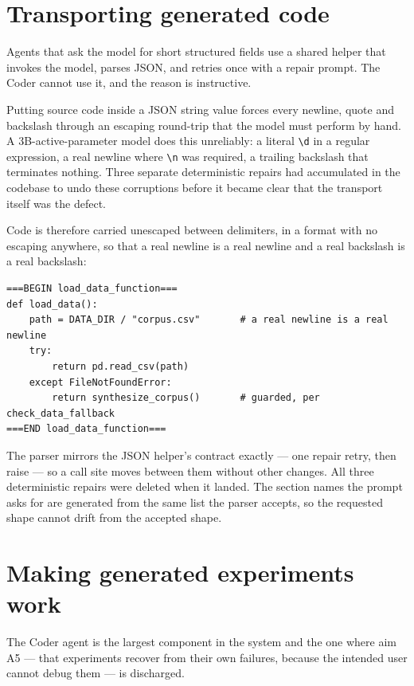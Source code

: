 \section{Transporting generated code}
\label{sec:transport}

Agents that ask the model for short structured fields use a shared helper that invokes the
model, parses JSON, and retries once with a repair prompt. The Coder cannot use it, and the
reason is instructive.

Putting source code inside a JSON string value forces every newline, quote and backslash
through an escaping round-trip that the model must perform by hand. A 3B-active-parameter
model does this unreliably: a literal \texttt{\textbackslash d} in a regular expression, a
real newline where \texttt{\textbackslash n} was required, a trailing backslash that
terminates nothing. Three separate deterministic repairs had accumulated in the codebase to
undo these corruptions before it became clear that the transport itself was the defect.

Code is therefore carried unescaped between delimiters, in a format with no escaping anywhere,
so that a real newline is a real newline and a real backslash is a real backslash:

\begin{lstlisting}[caption={The delimited section format used for all code-bearing responses.},label={lst:sections}]
===BEGIN load_data_function===
def load_data():
    path = DATA_DIR / "corpus.csv"       # a real newline is a real newline
    try:
        return pd.read_csv(path)
    except FileNotFoundError:
        return synthesize_corpus()       # guarded, per check_data_fallback
===END load_data_function===
\end{lstlisting}

The parser mirrors the JSON helper's contract exactly --- one repair retry, then raise --- so a
call site moves between them without other changes. All three deterministic repairs were
deleted when it landed. The section names the prompt asks for are generated from the same list
the parser accepts, so the requested shape cannot drift from the accepted shape.

\section{Making generated experiments work}
\label{sec:coder}

The Coder agent is the largest component in the system and the one where aim A5 --- that
experiments recover from their own failures, because the intended user cannot debug them ---
is discharged.

